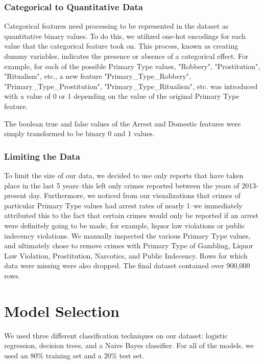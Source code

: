 \documentclass[10pt]{SelfArx} %
\begin{document}
        \subsubsection{Categorical to Quantitative Data}
        Categorical features need processing to be represented in the dataset as quantitative binary values. To do this, we utilized one-hot encodings for each value that the categorical feature took on. This process, known as creating dummy variables, indicates the presence or absence of a categorical effect. For example, for each of the possible Primary Type values, "Robbery", "Prostitution", "Ritualism", etc., a new feature "Primary\_Type\_Robbery", "Primary\_Type\_Prostitution", "Primary\_Type\_Ritualism", etc. was introduced with a value of 0 or 1 depending on the value of the original Primary Type feature.

        The boolean true and false values of the Arrest and Domestic features were simply transformed to be binary 0 and 1 values.

        \subsubsection{Limiting the Data}
        To limit the size of our data, we decided to use only reports that have taken place in the last 5 years--this left only crimes reported between the years of 2013-present day. Furthermore, we noticed from our visualizations that crimes of particular Primary Type values had arrest rates of nearly 1--we immediately attributed this to the fact that certain crimes would only be reported if an arrest were definitely going to be made, for example, liquor law violations or public indecency violations. We manually inspected the various Primary Type values, and ultimately chose to remove crimes with Primary Type of Gambling, Liquor Law Violation, Prostitution, Narcotics, and Public Indecency. Rows for which data were missing were also dropped. The final dataset contained over 900,000 rows.

\section{Model Selection}
We used three different classification techniques on our dataset: logistic regression, decision trees, and a Naive Bayes classifier. For all of the models, we used an 80\% training set and a 20\% test set.
\end{document}
